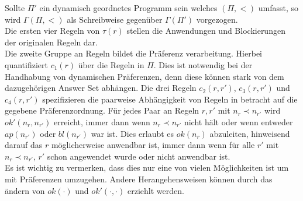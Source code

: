 Sollte $\Pi'$ ein dynamisch geordnetes Programm sein welches $(\Pi, <)$ umfasst,
so wird $\Gamma(\Pi, <)$ als Schreibweise gegenüber $\Gamma(\Pi')$ vorgezogen.\\
Die ersten vier Regeln von $\tau(r)$ stellen die Anwendungen und Blockierungen
der originalen Regeln dar.\\
Die zweite Gruppe an Regeln bildet die Präferenz verarbeitung. Hierbei
quantifiziert $c_1(r)$ über die Regeln in $\Pi$. Dies ist notwendig bei der
Handhabung von dynamischen Präferenzen, denn diese können stark von dem
dazugehörigen Answer Set abhängen.
Die drei Regeln $c_2(r, r')$, $c_3(r, r')$ und $c_4(r, r')$ spezifizieren die
paarweise Abhängigkeit von Regeln in betracht auf die gegebene
Präferenzordnung. Für jedes Paar an Regeln $r, r'$ mit $n_r \prec n_{r'}$ wird
$ok'(n_r, n_{r'})$ erreicht, immer dann wenn $n_r \prec n_{r'}$ nicht hält oder
wenn entweder $ap(n_{r'})$ oder $bl(n_{r'})$ war ist. Dies erlaubt es $ok(n_r)$
abzuleiten, hinweisend darauf das $r$ möglicherweise anwendbar ist, immer dann
wenn für alle $r'$ mit $n_r \prec n_{r'}$, $r'$ schon angewendet wurde oder
nicht anwendbar ist.\\
Es ist wichtig zu vermerken, dass dies nur eine von vielen Möglichkeiten ist
um mit Präferenzen umzugehen. Andere Herangehensweisen können durch das ändern
von $ok(\cdot)$ und $ok'(\cdot, \cdot)$ erziehlt werden.



